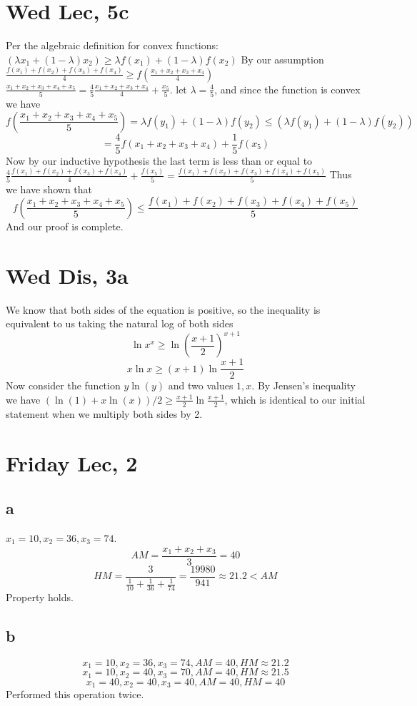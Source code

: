 \documentclass[12pt]{article}
\begin{document}
\section{Wed Lec, 5c}
Per the algebraic definition for convex functions: $(\lambda x_1+(1- \lambda)x_2) \geq \lambda f(x_1)+(1- \lambda)f(x_2)$
By our assumption $\frac{f(x_1)+f(x_2)+f(x_3)+f(x_4)}{4} \geq f(\frac{x_1+x_2+x_3+x_4}{4})$
\newline
$\frac{x_1+x_2+x_3+x_4+x_5}{5} = \frac{4}{5}\frac{x_1+x_2+x_3+x_4}{4} + \frac{x_5}{5}$. let $\lambda = \frac{4}{5}$, and since the function is convex we have
$$f(\frac{x_1+x_2+x_3+x_4+x_5}{5}) = \lambda f(y_1)+(1- \lambda)f(y_2) \leq (\lambda f(y_1)+(1- \lambda)f(y_2))$$
$$ = \frac{4}{5}f(x_1+x_2+x_3+x_4) + \frac{1}{5}f(x_5) $$
Now by our inductive hypothesis the last term is less than or equal to $\frac{4}{5}\frac{f(x_1)+f(x_2)+f(x_3)+f(x_4)}{4} + \frac{f(x_5)}{5} = \frac{f(x_1)+f(x_2)+f(x_3)+f(x_4)+f(x_5)}{5}$
Thus we have shown that
$$f(\frac{x_1+x_2+x_3+x_4+x_5}{5}) \leq \frac{f(x_1)+f(x_2)+f(x_3)+f(x_4)+f(x_5)}{5}$$
And our proof is complete.
\newpage

\section{Wed Dis, 3a}
We know that both sides of the equation is positive, so the inequality is equivalent to us taking the natural log of both sides
$$\ln{x^x} \geq \ln{(\frac{x+1}{2})^{x+1}}$$
$$x \ln{x} \geq (x+1)\ln{\frac{x+1}{2}}$$
Now consider the function $y\ln(y)$ and two values $1, x$. By Jensen's inequality we have $(\ln(1)+x\ln(x))/2 \geq \frac{x+1}{2}\ln\frac{x+1}{2}$, which is identical to our initial statement when we multiply both sides by 2.

\newpage

\section{Friday Lec, 2}
\subsection{a}
$x_1 = 10, x_2 = 36, x_3 = 74$.
$$AM = \frac{x_1+x_2+x_3}{3} = 40$$
$$HM = \frac{3}{\frac{1}{10} + \frac{1}{36} + \frac{1}{74}} = \frac{19980}{941} \approx 21.2 < AM$$
Property holds.

\subsection{b}
$$x_1 = 10, x_2 = 36, x_3 = 74, AM = 40, HM \approx 21.2$$
$$x_1 = 10, x_2 = 40, x_3 = 70, AM = 40, HM \approx 21.5$$
$$x_1 = 40, x_2 = 40, x_3 = 40, AM = 40, HM = 40$$
Performed this operation twice.
\end{document}

